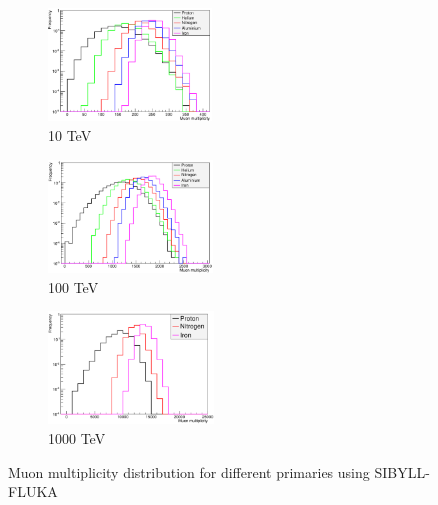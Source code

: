 \documentclass[12pt]{article}
\begin{document}
\begin{figure}
\begin{subfigure}{0.32\textwidth}
\includegraphics[width=0.9\linewidth, height=3cm]{sibyllmm10} 
\caption{10 TeV}
\label{fig:sibyllmm10}
\end{subfigure}
\begin{subfigure}{0.32\textwidth}
\includegraphics[width=0.9\linewidth, height=3cm]{sibyllmm100} 
\caption{100 TeV}
\label{fig:sibyllmm100}
\end{subfigure}
\begin{subfigure}{0.32\textwidth}
\includegraphics[width=0.9\linewidth, height = 3cm]{sibyllmm1000} 
\caption{1000 TeV}
\label{fig:sibyllmm1000}
\end{subfigure}
\caption{Muon multiplicity distribution for different primaries using SIBYLL-FLUKA}
\label{fig:sibyllmm}
\end{figure}
 
\end{document}
